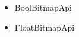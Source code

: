 \documentclass[11pt,twoside,a4paper]{article}
\begin{document}
\begin{itemize}
\item BoolBitmapApi
\item FloatBitmapApi
  
\end{itemize}
\end{document}
